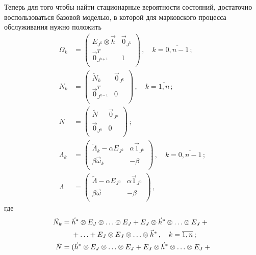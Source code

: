 \begin{multicols}{2}
Теперь для того чтобы найти стационарные вероятности состояний,
достаточно воспользоваться базовой моделью, в которой для марковского
процесса обслуживания нужно положить
\begin{align*}
\Omega_k &=
\begin{pmatrix}
E_{J^k} \otimes \vec h   &  \vec0_{J^k}    \\
\vec0_{J^{k+1}}^T        &  1              \\
\end{pmatrix}\,, \quad  k=\overline{0,n-1}\,;\\
N_k&=
\begin{pmatrix}
\tilde N_k           &  \vec0_{J^k}  \\
\vec0_{J^{k-1}}^T    &  0            \\
\end{pmatrix}\,,
\quad k=\overline{1,n}\,;\\
N&=
\begin{pmatrix}
\tilde N     &  \vec0_{J^n}  \\
\vec0_{J^n}        &  0      \\
\end{pmatrix}\,;\\
\Lambda_k &=
\begin{pmatrix}
\tilde \Lambda_k - \alpha E_{J^k}   &    \alpha \vec1_{J^k}  \\
\beta \vec \omega_k                 &    - \beta             \\
\end{pmatrix}\,,
\quad k=\overline{0,n-1}\,;\\
\Lambda &=
\begin{pmatrix}
\tilde \Lambda - \alpha E_{J^n}   &    \alpha \vec1_{J^n}  \\
\beta \vec \omega                 &    - \beta             \\
\end{pmatrix}\,,
\end{align*}
где
\begin{align}
\tilde N_k  & = \vec h^* \otimes E_J \otimes \ldots \otimes E_J +
E_J \otimes \vec h^* \otimes \ldots \otimes E_J +{}\notag\\
&\ \ \ \ {}+ \ldots + E_J \otimes E_J \otimes \ldots \otimes \vec h^*\,,
\quad k=\overline{1,n}\,;\label{3.1} \\       %
\tilde N & = (\vec h^* \otimes E_J \otimes \ldots \otimes E_J +
E_J \otimes \vec h^* \otimes \ldots \otimes E_J +{}\notag\\

\end{align}
\end{multicols}
